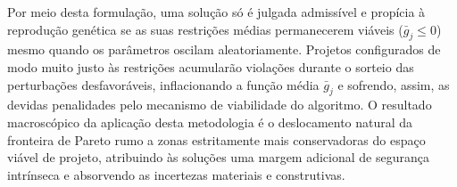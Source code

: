  Por meio desta formulação, uma solução só é julgada admissível e propícia à reprodução genética se as suas restrições médias permanecerem viáveis ($\bar{g}_j \leq 0$) mesmo quando os parâmetros oscilam aleatoriamente. Projetos configurados de modo muito justo às restrições acumularão violações durante o sorteio das perturbações desfavoráveis, inflacionando a função média $\bar{g}_j$ e sofrendo, assim, as devidas penalidades pelo mecanismo de viabilidade do algoritmo. O resultado macroscópico da aplicação desta metodologia é o deslocamento natural da fronteira de Pareto rumo a zonas estritamente mais conservadoras do espaço viável de projeto, atribuindo às soluções uma margem adicional de segurança intrínseca e absorvendo as incertezas materiais e construtivas.